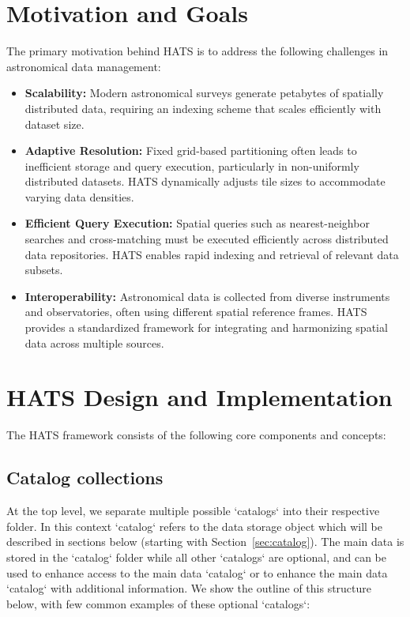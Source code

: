 \documentclass[11pt,a4paper]{ivoa}
\begin{document}
\section{Motivation and Goals}
    The primary motivation behind HATS is to address the following challenges in astronomical data management:
    \begin{itemize}
        \item \textbf{Scalability:} Modern astronomical surveys generate petabytes of spatially distributed data, requiring an indexing scheme that scales efficiently with dataset size.
        \item \textbf{Adaptive Resolution:} Fixed grid-based partitioning often leads to inefficient storage and query execution, particularly in non-uniformly distributed datasets. HATS dynamically adjusts tile sizes to accommodate varying data densities.
        \item \textbf{Efficient Query Execution:} Spatial queries such as nearest-neighbor searches and cross-matching must be executed efficiently across distributed data repositories. HATS enables rapid indexing and retrieval of relevant data subsets.
        \item \textbf{Interoperability:} Astronomical data is collected from diverse instruments and observatories, often using different spatial reference frames. HATS provides a standardized framework for integrating and harmonizing spatial data across multiple sources.
    \end{itemize}

\section{HATS Design and Implementation}
    The HATS framework consists of the following core components and concepts:
    
\subsection{Catalog collections}
    
At the top level, we separate multiple possible `catalogs` into their respective folder. In this context `catalog` refers to the data storage object which will be described in sections below (starting with Section~\ref{sec:catalog}). The main data is stored in the `catalog` folder while all other `catalogs` are optional, and can be used to enhance access to the main data `catalog` or to enhance the main data `catalog` with additional information. We show the outline of this structure below, with few common examples of these optional `catalogs`:
    
\end{document}
